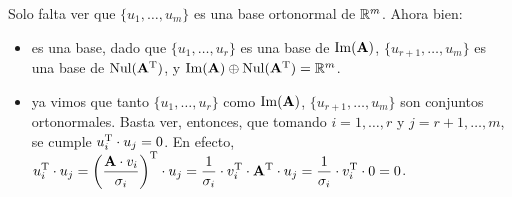 \begin{enumerate}[label=(\roman*)]
    Solo falta ver que $\lbrace u_1, \dots, u_m \rbrace$ es una base
    ortonormal de $\mathbb{R}^m$. Ahora bien:
    \begin{itemize}
    \item es una base, dado que $\lbrace u_1, \dots, u_r \rbrace$ es una base de
        $\operatorname{Im}(\mathbf{A})$, $\lbrace u_{r+1},\dots,u_m \rbrace$ es una base de
        $\operatorname{Nul}(\mathbf{A}^{\mathrm{T}})$, y $\operatorname{Im}(\mathbf{A}) \oplus \operatorname{Nul}(\mathbf{A}^{\mathrm{T}}) =
        \mathbb{R}^m$.
    \item ya vimos que tanto $\lbrace u_1, \dots, u_r \rbrace$ como
        $\operatorname{Im}(\mathbf{A})$, $\lbrace u_{r+1},\dots,u_m \rbrace$ son conjuntos
        ortonormales. Basta ver, entonces, que tomando $i = 1,\dots,r$ y
        $j = r+1,\dots,m$, se cumple $u_i^{\mathrm{T}} \cdot u_j = 0$. En efecto,
        $\displaystyle u_i^{\mathrm{T}} \cdot u_j
            = \left( \frac{\mathbf{A} \cdot v_i}{\sigma_i} \right)^{\mathrm{T}} \cdot u_j
            = \frac{1}{\sigma_i} \cdot v_i^{\mathrm{T}} \cdot \mathbf{A}^{\mathrm{T}} \cdot u_j
            = \frac{1}{\sigma_i} \cdot v_i^{\mathrm{T}} \cdot 0
            = 0$.

    \end{itemize}

\end{enumerate}

